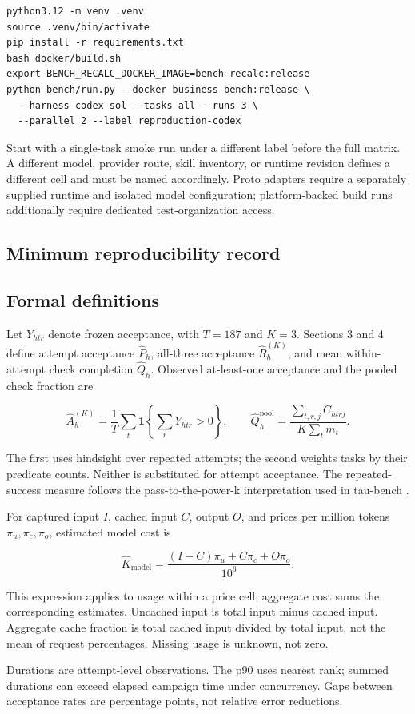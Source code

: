 \begin{verbatim}
python3.12 -m venv .venv
source .venv/bin/activate
pip install -r requirements.txt
bash docker/build.sh
export BENCH_RECALC_DOCKER_IMAGE=bench-recalc:release
python bench/run.py --docker business-bench:release \
  --harness codex-sol --tasks all --runs 3 \
  --parallel 2 --label reproduction-codex
\end{verbatim}

Start with a single-task smoke run under a different label before the full matrix. A different model, provider route, skill inventory, or runtime revision defines a different cell and must be named accordingly. Proto adapters require a separately supplied runtime and isolated model configuration; platform-backed build runs additionally require dedicated test-organization access.

\subsection{Minimum reproducibility record}\label{minimum-reproducibility-record}



\subsection{Formal definitions}\label{formal-definitions}

Let \(Y_{htr}\) denote frozen acceptance, with \(T=187\) and \(K=3\). Sections 3 and 4 define attempt acceptance \(\widehat P_h\), all-three acceptance \(\widehat R_h^{(K)}\), and mean within-attempt check completion \(\widehat Q_h\). Observed at-least-one acceptance and the pooled check fraction are

\[
\widehat A_h^{(K)}=\frac{1}{T}\sum_t
\mathbf{1}\!\left\{\sum_rY_{htr}>0\right\},
\qquad
\widehat Q_h^{\mathrm{pool}}=
\frac{\sum_{t,r,j}C_{htrj}}{K\sum_t m_t}.
\]

The first uses hindsight over repeated attempts; the second weights tasks by their predicate counts. Neither is substituted for attempt acceptance. The repeated-success measure follows the pass-to-the-power-k interpretation used in tau-bench \citep{taubench}.

For captured input \(I\), cached input \(C\), output \(O\), and prices per million tokens \(\pi_u,\pi_c,\pi_o\), estimated model cost is

\[
\widehat K_{\mathrm{model}}=
\frac{(I-C)\pi_u+C\pi_c+O\pi_o}{10^6}.
\]

This expression applies to usage within a price cell; aggregate cost sums the corresponding estimates. Uncached input is total input minus cached input. Aggregate cache fraction is total cached input divided by total input, not the mean of request percentages. Missing usage is unknown, not zero.

Durations are attempt-level observations. The p90 uses nearest rank; summed durations can exceed elapsed campaign time under concurrency. Gaps between acceptance rates are percentage points, not relative error reductions.
